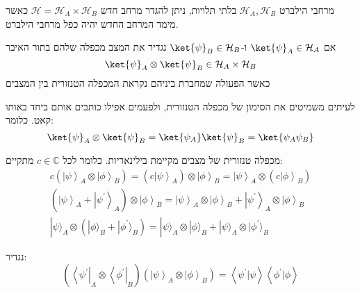 \documentclass{tstextbook}
\begin{document}
\begin{definition}
מרחבי הילברט \(\mathcal{H}_{A},\mathcal{H}_{B}\) בלתי תלויות, ניתן להגדר מרחב חדש \(\mathcal{H}=\mathcal{H}_{A}\times \mathcal{H}_{B}\) כאשר מימד המרחב החדש יהיה כפל מרחבי הילברט.

\end{definition}
\begin{definition}
אם \(\ket{\psi}_{A}\in \mathcal{H}_{A}\) ו-\(\ket{\psi}_{B}\in \mathcal{H}_{B}\) נגדיר את המצב מכפלה שלהם בתור האיבר
$$\ket{\psi} _{A}\otimes \ket{\psi} _{B} \in \mathcal{H}_{A}\times \mathcal{H}_{B}$$
כאשר הפעולה שמחברת ביניהם נקראת המכפלה הטנזורית בין המצבים

\end{definition}
\begin{symbolize}
לעיתים משמיטים את הסימון של מכפלה הטנזורית, ולפעמים אפילו כותבים אותם ביחד באותו קאט. כלומר:
$$\ket{\psi} _{A}\otimes \ket{\psi} _{B}=\ket{\psi_{A}} \ket{\psi} _{B}=\ket{\psi_{A}\psi_{B}} $$

\end{symbolize}
\begin{proposition}
מכפלה טנזורית של מצבים מקיימת בילינאריות. כלומר לכל \(c \in \mathbb{C}\) מתקיים:
\begin{gather*}c\left(\left|\psi\right\rangle_{A}\otimes\left|\phi\right\rangle_{B}\right)=\left(c\left|\psi\right\rangle_{A}\right)\otimes\left|\phi\right\rangle_{B}=\left|\psi\right\rangle_{A}\otimes\left(c\left|\phi\right\rangle_{B}\right) \\\left(\left|\psi\right\rangle_{A}+\left|\psi^{\prime}\right\rangle_{A}\right)\otimes\left|\phi\right\rangle_{B}=\left|\psi\right\rangle_{A}\otimes\left|\phi\right\rangle_{B}+\left|\psi^{\prime}\right\rangle_{A}\otimes\left|\phi\right\rangle_{B} \\|\psi\rangle_{A}\otimes(|\phi\rangle_{B}+|\phi^{\prime}\rangle_{B})=|\psi\rangle_{A}\otimes|\phi\rangle_{B}+|\psi\rangle_{A}\otimes|\phi^{\prime}\rangle_{B}
\end{gather*}

\end{proposition}
\begin{definition}
נגדיר:
$$\left(\left\langle\psi^{\prime}\right|_{A}\otimes\left\langle\phi^{\prime}\right|_{B}\right)\left(\left|\psi\right\rangle_{A}\otimes\left|\phi\right\rangle_{B}\right)=\left\langle\psi^{\prime}|\psi\right\rangle\left\langle\phi^{\prime}|\phi\right\rangle$$

\end{definition}
\end{document}
